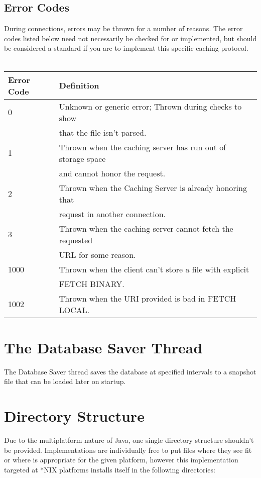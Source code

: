 \documentclass[letterpaper]{article}
\begin{document}
\subsection{Error Codes}
During connections, errors may be thrown for a number of reasons. The error codes listed below need not necessarily be checked for or implemented, but should be considered a standard if you are to implement this specific caching protocol.
\\
\\
\begin{tabular}{|l|l|}
\hline
\textbf{Error Code} & \textbf{Definition}\\
\hline
\hline
0 & Unknown or generic error; Thrown during checks to show \\
  & that the file isn't parsed.\\
\hline
1 & Thrown when the caching server has run out of storage space \\
  & and cannot honor the request.\\
\hline
2 & Thrown when the Caching Server is already honoring that \\
  & request in another connection.\\
\hline
3 & Thrown when the caching server cannot fetch the requested \\
  & URL for some reason.\\
\hline
1000 & Thrown when the client can't store a file with explicit\\
     & FETCH BINARY.\\
\hline
1002 & Thrown when the URI provided is bad in FETCH LOCAL.\\
\hline
\end{tabular}

\section{The Database Saver Thread}
The Database Saver thread saves the database at specified intervals to a snapshot file that can be loaded later on startup. 

\section{Directory Structure}
Due to the multiplatform nature of Java, one single directory structure shouldn't be provided. Implementations are individually free to put files where they see fit or where is appropriate for the given platform, however this implementation targeted at *NIX platforms installs itself in the following directories:
\end{document}
